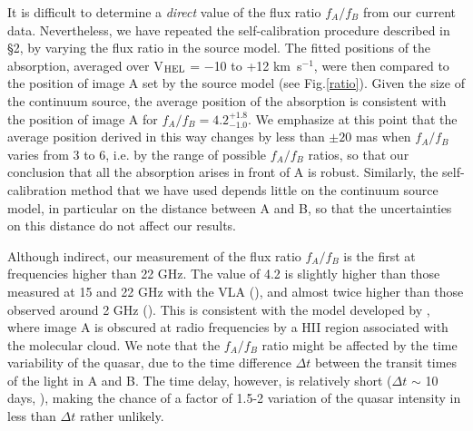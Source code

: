 \documentclass[oldversion]{aa}
\begin{document}
It is difficult to determine a {\em direct} value of the flux ratio $f_A/f_B$ from our
current data. Nevertheless, we have repeated the self-calibration procedure described in
\S2, by varying the flux ratio in the source model. The fitted positions of the
absorption, averaged over V$_{\rm HEL}$ = $-$10 to +12 km~s$^{-1}$, were then compared to
the position of image A set by the source model (see Fig.\ref{ratio}). Given the size of
the continuum source, the average position of the absorption is consistent with the
position of image A for $f_A/f_B = 4.2 _{-1.0} ^{+1.8}$. We emphasize at this point that
the average position derived in this way changes by less than $\pm 20$ mas when $f_A/f_B$ varies
from 3 to 6, i.e. by the range of possible $f_A/f_B$ ratios, so that our
conclusion that all the absorption arises in front of A is robust. Similarly, the
self-calibration method that we have used depends little on the continuum source model, in
particular on the distance between A and B, so that the uncertainties on this distance do
not affect our results.

Although indirect, our measurement of the flux ratio $f_A/f_B$ is the first at frequencies
higher than 22 GHz. The value of 4.2 is slightly higher than those measured at 15 and 22 GHz with the
VLA (\citealt{ode92, pat93,big99}), and almost twice higher than those observed around 2 GHz
(\citealt{mit06a}). This is consistent with the model developed by \citet{mit06b},
where image A is obscured at radio frequencies by a HII region associated with the
molecular cloud. We note that the $f_A/f_B$ ratio might be affected by the time variability
of the quasar, due to the time difference $\Delta t$ between the transit times of the light
in A and B. The time delay, however, is relatively short ($\Delta t$ $\sim$ 10 days,
\citealt{big99}), making the chance of a factor of 1.5-2 variation of the quasar intensity
in less than $\Delta t$ rather unlikely.
\end{document}
